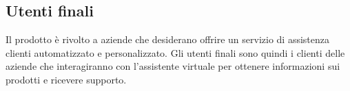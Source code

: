\subsection{Utenti finali}
Il prodotto è rivolto a aziende che desiderano offrire un servizio di assistenza 
clienti automatizzato e personalizzato. Gli utenti finali sono quindi i clienti 
delle aziende che interagiranno con l’assistente virtuale per ottenere 
informazioni sui prodotti e ricevere supporto.
